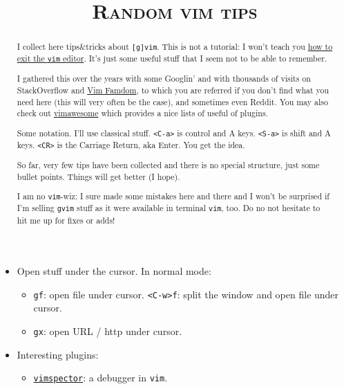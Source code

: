 \documentclass[a4paper,12pt,%
              final%
              ]{article}
\title{\color{\maincolor}\Huge\bfseries\scshape Random vim tips}
\author{\vspace{-7ex}}
\date{\vspace{-7ex}}
\begin{document}
%
%
\maketitle
%
\vspace*{-2.5cm}

\begin{abstract}
\parindent=0pt
\setlength{\parskip}{2pt}
\noindent
I collect here tips\&tricks about \texttt{[g]vim}. This is not a tutorial: I won't
teach you
\href{https://stackoverflow.com/questions/11828270/how-do-i-exit-the-vim-editor}{how
to exit the \texttt{vim} editor}. It's just some useful stuff that I seem not to be
able to remember.

I gathered this over the years with some Googlin' and with thousands of visits on
StackOverflow and \href{https://vim.fandom.com/wiki/Vim_Tips_Wiki}{Vim Famdom}, to
which you are referred if you don't find what you need here (this will very often be
the case), and sometimes even Reddit. You may also check out
\href{https://vimawesome.com/}{vimawesome} which provides a nice lists of useful of
plugins.

Some notation. I'll use classical stuff. \texttt{<C-a>} is control and A keys.
\texttt{<S-a>} is shift and A keys. \texttt{<CR>} is the Carriage Return, aka Enter.
You get the idea.

So far, very few tips have been collected and there is no special structure, just
some bullet points. Things will get better (I hope).

I am no \texttt{vim}-wiz: I sure made some mistakes here and there and I won't be
surprised if I'm selling \texttt{gvim} stuff as it were available in terminal
\texttt{vim}, too. Do no not hesitate to hit me up for fixes or adds!
\end{abstract}
%
\begin{itemize}
  \item Open stuff under the cursor. In normal mode:
    \begin{itemize}
      \item \texttt{gf}: open file under cursor. \texttt{<C-w>f}: split the window
        and open file under cursor.
      \item \texttt{gx}: open URL / http under cursor.
    \end{itemize}
  \item Interesting plugins:
    \begin{itemize}
      \item \href{https://github.com/puremourning/vimspector}{\texttt{vimspector}}: a debugger in \texttt{vim}.
    \end{itemize}
\end{itemize}
%
%
\end{document}
